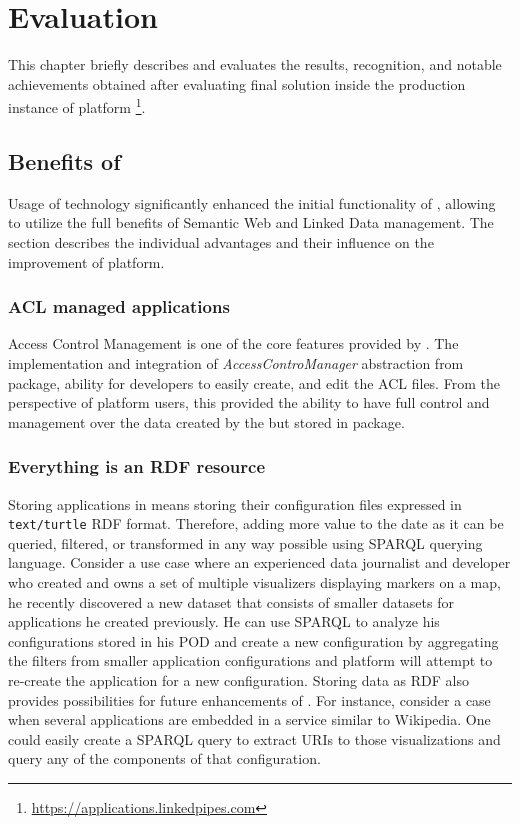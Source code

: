 \chapter{Evaluation}
\label{chap:num_6}

This chapter briefly describes and evaluates the results, recognition, and notable achievements obtained after evaluating final \lpas{} solution inside the production instance of \lpa{} platform \footnote{\url{https://applications.linkedpipes.com}}.

\section{Benefits of \solid{}}

Usage of \solid{} technology significantly enhanced the initial functionality of \lpa{}, allowing to utilize the full benefits of Semantic Web and Linked Data management. The section describes the individual advantages and their influence on the improvement of \lpa{} platform.

\subsection{ACL managed applications}

Access Control Management is one of the core features provided by \solid{}. The implementation and integration of \textit{AccessControManager} abstraction from \lpas{} package, ability for \lpa{} developers to easily create, and edit the ACL files. From the perspective of \lpa{} platform users, this provided the ability to have full control and management over the data created by the \lpa{} but stored in \lpas{} package. 

\subsection{Everything is an RDF resource}

Storing \lpa{} applications in \solid{} means storing their configuration files expressed in \texttt{text/turtle} RDF format. Therefore, adding more value to the date as it can be queried, filtered, or transformed in any way possible using SPARQL querying language. Consider a use case where an experienced data journalist and developer who created and owns a set of multiple visualizers displaying markers on a map, he recently discovered a new dataset that consists of smaller datasets for applications he created previously. He can use SPARQL to analyze his configurations stored in his \solid{} POD and create a new configuration by aggregating the filters from smaller application configurations and \lpa{} platform will attempt to re-create the application for a new configuration.
Storing data as RDF also provides possibilities for future enhancements of \lpas{}. For instance, consider a case when several \lpa{} applications are embedded in a service similar to Wikipedia. One could easily create a SPARQL query to extract URIs to those visualizations and query any of the components of that configuration. 

